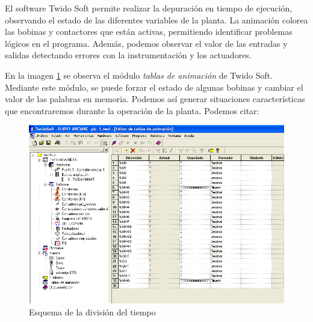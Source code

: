 El software Twido Soft permite realizar la depuración
en tiempo de ejecución, observando el estado de las diferentes variables
de la planta.
La animación colorea las bobinas y contactores que están activas, permitiendo
identificar problemas lógicos en el programa.
Además, podemos observar el valor de las entradas y salidas detectando
errores con la instrumentación y los actuadores.

En la imagen \ref{img:twidosoftdebug} se observa el módulo \emph{tablas
de animación} de Twido Soft.
Mediante este módulo, se puede forzar el estado de algunas bobinas y cambiar el
valor de las palabras en memoria.
Podemos así generar situaciones características que encontraremos durante la
operación de la planta.
Podemos citar:

\begin{figure}[ht]
	\centering
	\includegraphics[width=.8\textwidth]
	{Cap4-ProgramacionPLC/images/twidosoftdebug.png}
	\caption{Esquema de la división del tiempo}
	\label{img:twidosoftdebug}
\end{figure}

